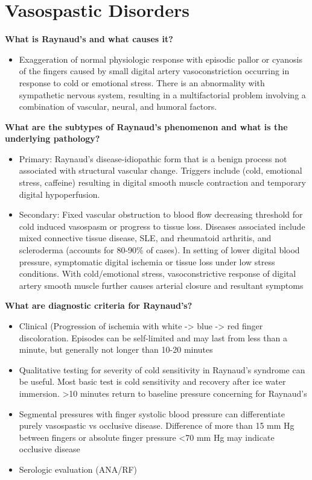\documentclass[
]{book}
\providecommand{\tightlist}{%
  \setlength{\itemsep}{0pt}\setlength{\parskip}{0pt}}
\begin{document}
\hypertarget{vasospastic-disorders}{%
\section{Vasospastic Disorders}\label{vasospastic-disorders}}

\textbf{What is Raynaud's and what causes it?} \citep{shuja117UpperExtremity, landry141RaynaudPhenomenon2019}

\begin{itemize}
\tightlist
\item
  Exaggeration of normal physiologic response with episodic pallor or
  cyanosis of the fingers caused by small digital artery
  vasoconstriction occurring in response to cold or emotional stress.
  There is an abnormality with sympathetic nervous system, resulting
  in a multifactorial problem involving a combination of vascular,
  neural, and humoral factors.
\end{itemize}

\textbf{What are the subtypes of Raynaud's phenomenon and what is the
underlying pathology?}

\begin{itemize}
\item
  Primary: Raynaud's disease-idiopathic form that is a benign process
  not associated with structural vascular change. Triggers include
  (cold, emotional stress, caffeine) resulting in digital smooth
  muscle contraction and temporary digital hypoperfusion.
\item
  Secondary: Fixed vascular obstruction to blood flow decreasing
  threshold for cold induced vasospasm or progress to tissue loss.
  Diseases associated include mixed connective tissue disease, SLE,
  and rheumatoid arthritis, and scleroderma (accounts for 80-90\% of
  cases). In setting of lower digital blood pressure, symptomatic
  digital ischemia or tissue loss under low stress conditions. With
  cold/emotional stress, vasoconstrictive response of digital artery
  smooth muscle further causes arterial closure and resultant symptoms
\end{itemize}

\textbf{What are diagnostic criteria for Raynaud's?}

\begin{itemize}
\item
  Clinical (Progression of ischemia with white -\textgreater{} blue -\textgreater{} red finger
  discoloration. Episodes can be self-limited and may last from less
  than a minute, but generally not longer than 10-20 minutes~
\item
  Qualitative testing for severity of cold sensitivity in Raynaud's
  syndrome can be useful. Most basic test is cold sensitivity and
  recovery after ice water immersion. \textgreater10 minutes return to baseline
  pressure concerning for Raynaud's
\item
  Segmental pressures with finger systolic blood pressure can
  differentiate purely vasospastic vs occlusive disease. Difference of
  more than 15 mm Hg between fingers or absolute finger pressure \textless70
  mm Hg may indicate occlusive disease~
\item
  Serologic evaluation (ANA/RF)
\end{itemize}
\end{document}
